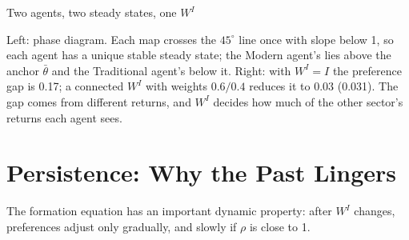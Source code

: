\documentclass[../structural_economics_book.tex]{subfiles}
\begin{document}
\begin{vizpanel}{Two agents, two steady states, one $W^I$}
\begin{center}
\end{center}
\vspace{-0.5em}
\small Left: phase diagram. Each map crosses the $45^\circ$ line once with slope below 1, so each agent has a unique stable steady state; the Modern agent's lies above the anchor $\bar{\theta}$ and the Traditional agent's below it. Right: with $W^I = I$ the preference gap is 0.17; a connected $W^I$ with weights $0.6/0.4$ reduces it to 0.03 (0.031). The gap comes from different returns, and $W^I$ decides how much of the other sector's returns each agent sees.
\end{vizpanel}


\section{Persistence: Why the Past Lingers}
\label{ch09:sec:hysteresis}

The formation equation has an important dynamic property: after $W^I$ changes, preferences adjust only gradually, and slowly if $\rho$ is close to 1.
\end{document}
